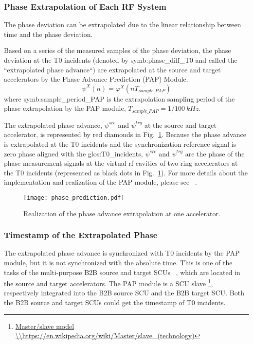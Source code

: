 \subsubsection{Phase Extrapolation of Each RF System}
The phase deviation can be extrapolated due to the linear relationship between time and the phase deviation. 

Based on a series of the measured samples of the phase deviation, the phase deviation at the T0 incidents (denoted by \gls{symb:phase_diff_T0} and called the ``extrapolated phase advance``) are extrapolated at the source and target accelerators by the Phase Advance Prediction (\gls{PAP}) Module.
\begin{equation}
\label{extra_phase}
\psi^\mathit{X}(n)=\varphi^X(nT_\mathit{sample\_PAP})
\end{equation}
where \gls{symb:sample_period_PAP} is the extrapolation sampling period of the phase extrapolation by the PAP module, $T_\mathit{sample\_PAP}=1/\SI{100}{kHz}$.

The extrapolated phase advance, $\psi^\mathit{src}$ and $\psi^\mathit{trg}$ at the source and target accelerator, is represented by red diamonds in Fig.~\ref{phase_prediction1}. Because the phase advance is extrapolated at the T0 incidents and the synchronization reference signal is zero phase aligned with the \gls{glos:T0_incidents}, $\psi^\mathit{src}$ and $\psi^\mathit{trg}$ are the phase of the phase measurement signals at the virtual rf cavities of two ring accelerators at the T0 incidents (represented as black dots in Fig.~\ref{phase_prediction1}). For more details about the implementation and realization of the PAP module, please see ~\cite{ferrand_development_nodate}.   
\begin{figure}[!htb]
   \centering   
   \texttt{[image: phase\_prediction.pdf]}
   \caption{Realization of the phase advance extrapolation at one accelerator.}
   \label{phase_prediction1}
\end{figure}
\subsubsection{Timestamp of the Extrapolated Phase}
The extrapolated phase advance is synchronized with T0 incidents by the PAP module, but it is not synchronized with the absolute time. This is one of the tasks of the multi-purpose B2B source and target SCUs ~\cite{beck_new_2012, thieme_scu_2013}, which are located in the source and target accelerators. The PAP module is a SCU slave \footnote{\url{Master/slave model \\https://en.wikipedia.org/wiki/Master/slave_(technology)}}, respectively integrated into the B2B source SCU and the B2B target SCU. Both the B2B source and target SCUs could get the timestamp of T0 incidents. 


